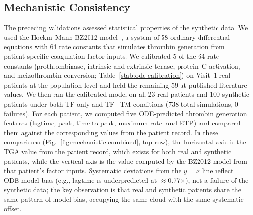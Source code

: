 
\subsection{Mechanistic Consistency}
\label{sec:results-l4}

The preceding validations assessed statistical properties of the synthetic data. 
We used the Hockin--Mann BZ2012 model~\citep{Hockin2002,BrummelZiedins2012}, a system
of 58 ordinary differential equations with 64 rate constants that simulates thrombin
generation from patient-specific coagulation factor inputs. We calibrated 5 of the
64 rate constants (prothrombinase, intrinsic and extrinsic tenase, protein~C
activation, and meizothrombin conversion; Table~\ref{stab:ode-calibration}) on Visit~1 real
patients at the population level and held the remaining 59 at published literature
values. We then ran the calibrated model on all 23 real patients and 100 synthetic
patients under both TF-only and TF+TM conditions (738 total simulations, 0 failures). For each patient, we
computed five ODE-predicted thrombin generation features (lagtime, peak, time-to-peak,
maximum rate, and ETP) and compared them against the corresponding values from the
patient record. In these comparisons (Fig.~\ref{fig:mechanistic-combined}, top row),
the horizontal axis is the TGA value from the patient record, which exists for both
real and synthetic patients, while the vertical axis is the value computed by the
BZ2012 model from that patient's factor inputs. Systematic deviations from the
$y{=}x$ line reflect ODE model bias (e.g., lagtime is underpredicted at
$\approx$0.77$\times$), not a failure of the synthetic data; the key observation is
that real and synthetic patients share the same pattern of model bias, occupying the
same cloud with the same systematic offset.

